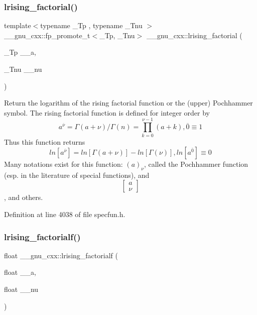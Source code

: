 \subsubsection{\texorpdfstring{lrising\+\_\+factorial()}{lrising\_factorial()}}
{\footnotesize\ttfamily template$<$typename \+\_\+\+Tp , typename \+\_\+\+Tnu $>$ \\
\+\_\+\+\_\+gnu\+\_\+cxx\+::fp\+\_\+promote\+\_\+t$<$\+\_\+\+Tp, \+\_\+\+Tnu$>$ \+\_\+\+\_\+gnu\+\_\+cxx\+::lrising\+\_\+factorial (\begin{DoxyParamCaption}\item[{\+\_\+\+Tp}]{\+\_\+\+\_\+a,  }\item[{\+\_\+\+Tnu}]{\+\_\+\+\_\+nu }\end{DoxyParamCaption})\hspace{0.3cm}{\ttfamily [inline]}}



Return the logarithm of the rising factorial function or the (upper) Pochhammer symbol. The rising factorial function is defined for integer order by \[ a^{\overline{\nu}} = \Gamma(a + \nu) / \Gamma(n) = \prod_{k=0}^{\nu-1} (a + k), \overline{0} \equiv 1 \] Thus this function returns \[ ln[a^{\overline{\nu}}] = ln[\Gamma(a + \nu)] - ln[\Gamma(\nu)], ln[a^{\overline{0}}] \equiv 0 \] Many notations exist for this function\+: $ (a)_\nu $, called the Pochhammer function (esp. in the literature of special functions), and \[ \left[ \begin{array}{c} a \\ \nu \end{array} \right] \], and others. 



Definition at line 4038 of file specfun.\+h.

\mbox{\label{group__gnu__math__spec__func_ga68c64f4e44d03b5b3f75f90dbe2e0819}} 
\subsubsection{\texorpdfstring{lrising\+\_\+factorialf()}{lrising\_factorialf()}}
{\footnotesize\ttfamily float \+\_\+\+\_\+gnu\+\_\+cxx\+::lrising\+\_\+factorialf (\begin{DoxyParamCaption}\item[{float}]{\+\_\+\+\_\+a,  }\item[{float}]{\+\_\+\+\_\+nu }\end{DoxyParamCaption})\hspace{0.3cm}{\ttfamily [inline]}}

